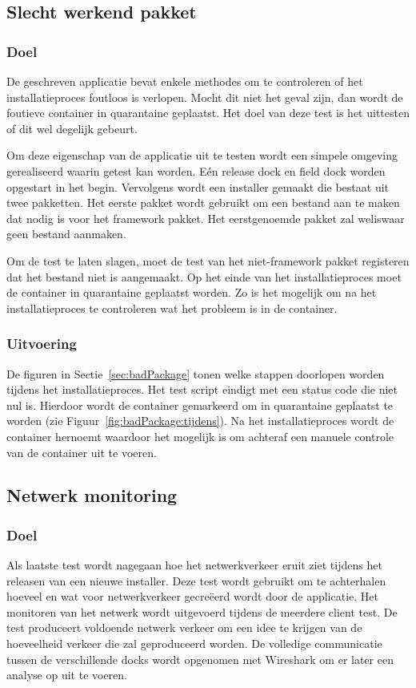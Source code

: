 \subsection{Slecht werkend pakket}
\subsubsection{Doel}
De geschreven applicatie bevat enkele methodes om te controleren of het installatieproces foutloos is verlopen.
Mocht dit niet het geval zijn, dan wordt de foutieve container in quarantaine geplaatst.
Het doel van deze test is het uittesten of dit wel degelijk gebeurt.

Om deze eigenschap van de applicatie uit te testen wordt een simpele omgeving gerealiseerd waarin getest kan worden.
Eén release dock en field dock worden opgestart in het begin.
Vervolgens wordt een installer gemaakt die bestaat uit twee pakketten.
Het eerste pakket wordt gebruikt om een bestand aan te maken dat nodig is voor het framework pakket.
Het eerstgenoemde pakket zal weliswaar geen bestand aanmaken.

Om de test te laten slagen, moet de test van het niet-framework pakket registeren dat het bestand niet is aangemaakt.
Op het einde van het installatieproces moet de container in quarantaine geplaatst worden.
Zo is het mogelijk om na het installatieproces te controleren wat het probleem is in de container.

\subsubsection{Uitvoering}
De figuren in Sectie~\ref{sec:badPackage} tonen welke stappen doorlopen worden tijdens het installatieproces.
Het test script eindigt met een status code die niet nul is.
Hierdoor wordt de container gemarkeerd om in quarantaine geplaatst te worden (zie Figuur~\ref{fig:badPackage:tijdens}).
Na het installatieproces wordt de container hernoemt waardoor het mogelijk is om achteraf een manuele controle van de container uit te voeren.

\subsection{Netwerk monitoring}
\subsubsection{Doel}
Als laatste test wordt nagegaan hoe het netwerkverkeer eruit ziet tijdens het releasen van een nieuwe installer.
Deze test wordt gebruikt om te achterhalen hoeveel en wat voor netwerkverkeer gecreëerd wordt door de applicatie.
Het monitoren van het netwerk wordt uitgevoerd tijdens de meerdere client test.
De test produceert voldoende netwerk verkeer om een idee te krijgen van de hoeveelheid verkeer die zal geproduceerd worden.
De volledige communicatie tussen de verschillende docks wordt opgenomen met Wireshark om er later een analyse op uit te voeren.

